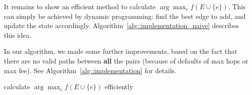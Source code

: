     It remains to show an efficient method to calculate
    $\arg\max_e f(E \cup \{e\})$. 
    This can simply be achieved by dynamic programming: 
    find the best edge to add, and update the state accordingly.
    Algorithm~\ref{alg::implementation_naive} describes this idea.
    
    In our algorithm, we made some further improvements, 
    based on the fact that there are no
    valid paths between \textbf{all} the pairs (because of defaults of max hops or max fee). 
    See Algorithm~\ref{alg::implementation} for details.
    
    \begin{algorithm}
        \DontPrintSemicolon
        
        \;
         
         \;
         
         \caption{calculate $\arg\max_e f(E \cup \{e\})$ efficiently}
         \label{alg::implementation_naive}
    \end{algorithm}
    
